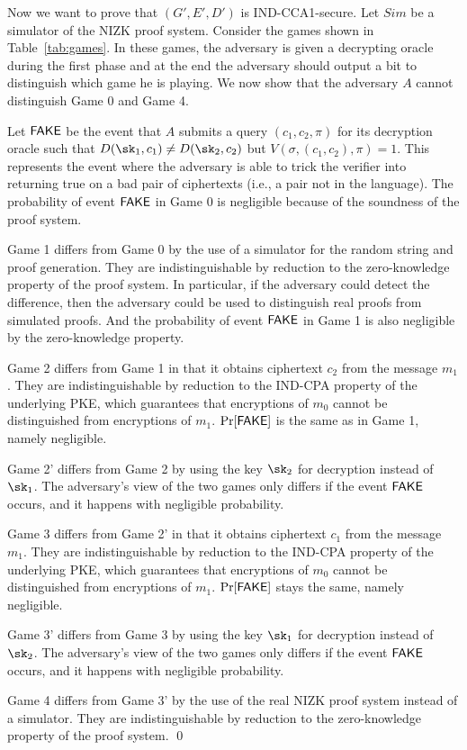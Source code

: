     Now we want to prove that $(G',E',D')$ is IND-CCA1-secure.
    Let $Sim$ be a simulator of the NIZK proof system.
    Consider the games shown in Table~\ref{tab:games}.
    In these games, the adversary is given a decrypting oracle during the first phase
    and at the end the adversary should output a bit to distinguish which game he is playing.
    We now show that the adversary $A$ cannot distinguish Game 0 and Game 4.

    Let $\mathsf{FAKE}$  be the event that $A$ submits a query $(c_1,c_2,\pi)$ for its decryption oracle such that $D(\sk_1,c_1) \neq D(\sk_2, c_2)$ but $V(\sigma,(c_1,c_2),\pi)=1$.
    This represents the event where the adversary is able to trick the verifier into returning true on a bad pair of ciphertexts (i.e., a pair not in the language).
    The probability of event $\mathsf{FAKE}$ in Game 0 is negligible because of the
    soundness of the proof system.

    Game 1 differs from Game 0 by the use of a simulator for the random string and proof generation.
    They are indistinguishable by reduction to the zero-knowledge property of the proof system.
    In particular, if the adversary could detect the difference, then the adversary could be used to distinguish real proofs from simulated proofs.
    And the probability of event $\mathsf{FAKE}$ in Game 1 is also negligible by the
    zero-knowledge property.

    Game 2 differs from Game 1 in that it obtains ciphertext $c_2$ from the message $m_1$.
    They are indistinguishable by reduction to the IND-CPA property of the underlying PKE,
    which guarantees that encryptions of $m_0$ cannot be distinguished from encryptions of $m_1$.
    $\Pr[\mathsf{FAKE}]$ is the same as in Game 1, namely negligible.

    Game 2' differs from Game 2 by using the key $\sk_2$ for decryption instead of $\sk_1$.
    The adversary's view of the two games only differs if the event $\mathsf{FAKE}$ occurs, and it happens with
    negligible probability.

    Game 3 differs from Game 2' in that it obtains ciphertext $c_1$ from the message $m_1$.
    They are indistinguishable by reduction to the IND-CPA property of the underlying PKE,
    which guarantees that encryptions of $m_0$ cannot be distinguished from encryptions of $m_1$.
    $\Pr[\mathsf{FAKE}]$ stays the same, namely negligible.

    Game 3' differs from Game 3 by using the key $\sk_1$ for decryption instead of $\sk_2$.
    The adversary's view of the two games only differs if the event $\mathsf{FAKE}$ occurs, and it happens with
    negligible probability.

    Game 4 differs from Game 3' by the use of the real NIZK proof system instead of a simulator.
    They are indistinguishable by reduction to the zero-knowledge property of the proof system.
    \qed


\fi